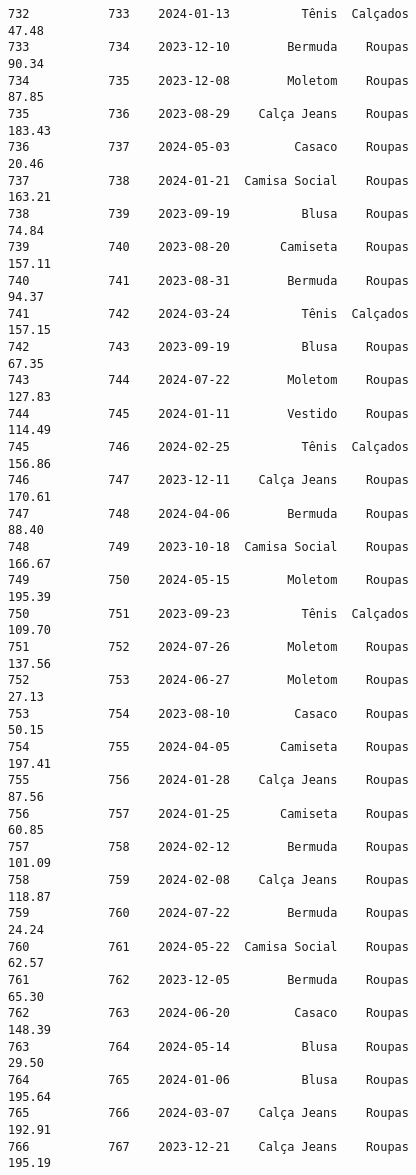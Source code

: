 \documentclass[11pt]{article}
\begin{document}
\begin{Verbatim}[commandchars=\\\{\}]
732           733    2024-01-13          Tênis  Calçados           47.48   
733           734    2023-12-10        Bermuda    Roupas           90.34   
734           735    2023-12-08        Moletom    Roupas           87.85   
735           736    2023-08-29    Calça Jeans    Roupas          183.43   
736           737    2024-05-03         Casaco    Roupas           20.46   
737           738    2024-01-21  Camisa Social    Roupas          163.21   
738           739    2023-09-19          Blusa    Roupas           74.84   
739           740    2023-08-20       Camiseta    Roupas          157.11   
740           741    2023-08-31        Bermuda    Roupas           94.37   
741           742    2024-03-24          Tênis  Calçados          157.15   
742           743    2023-09-19          Blusa    Roupas           67.35   
743           744    2024-07-22        Moletom    Roupas          127.83   
744           745    2024-01-11        Vestido    Roupas          114.49   
745           746    2024-02-25          Tênis  Calçados          156.86   
746           747    2023-12-11    Calça Jeans    Roupas          170.61   
747           748    2024-04-06        Bermuda    Roupas           88.40   
748           749    2023-10-18  Camisa Social    Roupas          166.67   
749           750    2024-05-15        Moletom    Roupas          195.39   
750           751    2023-09-23          Tênis  Calçados          109.70   
751           752    2024-07-26        Moletom    Roupas          137.56   
752           753    2024-06-27        Moletom    Roupas           27.13   
753           754    2023-08-10         Casaco    Roupas           50.15   
754           755    2024-04-05       Camiseta    Roupas          197.41   
755           756    2024-01-28    Calça Jeans    Roupas           87.56   
756           757    2024-01-25       Camiseta    Roupas           60.85   
757           758    2024-02-12        Bermuda    Roupas          101.09   
758           759    2024-02-08    Calça Jeans    Roupas          118.87   
759           760    2024-07-22        Bermuda    Roupas           24.24   
760           761    2024-05-22  Camisa Social    Roupas           62.57   
761           762    2023-12-05        Bermuda    Roupas           65.30   
762           763    2024-06-20         Casaco    Roupas          148.39   
763           764    2024-05-14          Blusa    Roupas           29.50   
764           765    2024-01-06          Blusa    Roupas          195.64   
765           766    2024-03-07    Calça Jeans    Roupas          192.91   
766           767    2023-12-21    Calça Jeans    Roupas          195.19   

\end{Verbatim}
\end{document}
